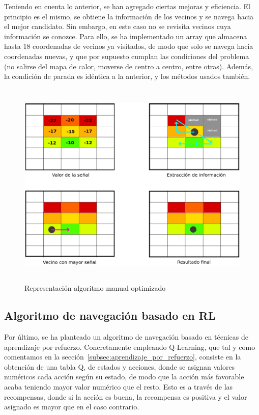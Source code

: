 Teniendo en cuenta lo anterior, se han agregado ciertas mejoras y eficiencia. El principio es el mismo, se obtiene la información de los vecinos y se navega hacia el mejor candidato. Sin embargo, en este caso no se revisita vecinos cuya información se conozce. Para ello, se ha implementado un array que almacena hasta 18 coordenadas de vecinos ya visitados, de modo que solo se navega hacia coordenadas nuevas, y que por supuesto cumplan las condiciones del problema (no salirse del mapa de calor, moverse de centro a centro, entre otras). Además, la condición de parada es idéntica a la anterior, y los métodos usados también.\\

\begin{figure} [t]
    \begin{center}
    \includegraphics[height=10cm]{imagenes/cap4/10_algoritmo_optimizado.png}
    \end{center}
    \caption[Representación algoritmo manual optimizado]{Representación algoritmo manual optimizado}
    \label{fig:opt_algorithm}
\end{figure}

\subsection{Algoritmo de navegación basado en \ac{RL}}
\label{subsec:alg-q}

Por último, se ha planteado un algoritmo de navegación basado en técnicas de aprendizaje por refuerzo. Concretamente empleando Q-Learning, que tal y como comentamos en la sección~\ref{subsec:aprendizaje_por_refuerzo}, consiste en la obtención de una tabla Q, de estados y acciones, donde se asignan valores numéricos cada acción según su estado, de modo que la acción más favorable acaba teniendo mayor valor numérico que el resto. Esto es a través de las recompensas, donde si la acción es buena, la recompensa es positiva y el valor asignado es mayor que en el caso contrario.\\

